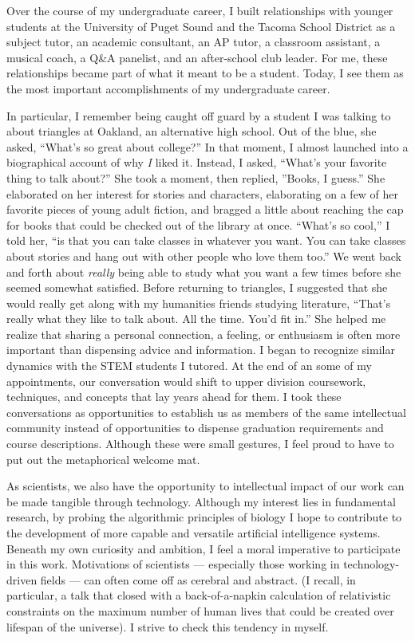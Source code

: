 Over the course of my undergraduate career, I built relationships with younger students at the University of Puget Sound and the Tacoma School District as a subject tutor, an academic consultant, an AP tutor, a classroom assistant, a musical coach, a Q\&A panelist, and an after-school club leader.
For me, these relationships became part of what it meant to be a student.
Today, I see them as the most important accomplishments of my undergraduate career.

In particular, I remember being caught off guard by a student I was talking to about triangles at Oakland, an alternative high school.
Out of the blue, she asked, ``What's so great about college?''
In that moment, I almost launched into a biographical account of why \textit{I} liked it.
Instead, I asked, ``What's your favorite thing to talk about?''
She took a moment, then replied, ''Books, I guess.''
She elaborated on her interest for stories and characters, elaborating on a few of her favorite pieces of young adult fiction, and bragged a little about reaching the cap for books that could be checked out of the library at once.
``What's so cool,'' I told her, ``is that you can take classes in whatever you want.
You can take classes about stories and hang out with other people who love them too.''
We went back and forth about \textit{really} being able to study what you want a few times before she seemed somewhat satisfied.
Before returning to triangles, I suggested that she would really get along with my humanities friends studying literature,
``That's really what they like to talk about.
All the time.
You'd fit in.''
She helped me realize that sharing a personal connection, a feeling, or enthusiasm is often more important than dispensing advice and information.
I began to recognize similar dynamics with the STEM students I tutored.
At the end of an some of my appointments, our conversation would shift to upper division coursework, techniques, and concepts that lay years ahead for them.
I took these conversations as opportunities to establish us as members of the same intellectual community instead of opportunities to dispense graduation requirements and course descriptions.
Although these were small gestures, I feel proud to have to put out the metaphorical welcome mat.

As scientists, we also have the opportunity to  intellectual impact of our work can be made tangible through technology.
Although my interest lies in fundamental research, by probing the algorithmic principles of biology I hope to contribute to the development of more capable and versatile artificial intelligence systems.
Beneath my own curiosity and ambition, I feel a moral imperative to participate in this work.
Motivations of scientists --- especially those working in technology-driven fields --- can often come off as cerebral and abstract.
(I recall, in particular, a talk that closed with a back-of-a-napkin calculation of relativistic constraints on the maximum number of human lives that could be created over lifespan of the universe).
I strive to check this tendency in myself.

